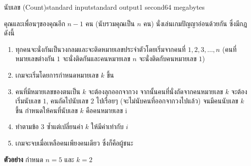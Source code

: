 \documentclass[11pt,a4paper]{article}
\begin{document}
\begin{problem}{นับเลข (Count)}{standard input}{standard output}{1 second}{64 megabytes}

คุณและเพื่อนๆของคุณอีก $n-1$ คน (นับรวมคุณเป็น $n$ คน) นั่งเล่นเกมปัญญาอ่อนด้วยกัน ซึ่งมีกฎดังนี้
\begin{enumerate}

\item ทุกคนจะนั่งกันเป็นวงกลมและจะติดหมายเลขประจำตัวโดยเริ่มจากคนที่ $1, 2, 3, … , n$ (คนที่หมายเลขต่างกัน $1$ จะนั่งติดกันและคนหมายเลข $n$ จะนั่งติดกับคนหมายเลข $1$)

\item เกมจะเริ่มโดยการกำหนดหมายเลข $k$ ขึ้น

\item คนที่มีหมายเลขของตนเป็น $k$ จะต้องลุกออกจากวง จากนั้นคนที่นั่งถัดจากคนหมายเลข $k$ จะต้องเริ่มนับเลข $1$, คนถัดไปนับเลข $2$ ไปเรื่อยๆ (จะไม่นับคนที่ออกจากวงไปแล้ว) จนมีคนนับเลข $k$ ขึ้น กำหนดให้คนที่นับเลข $k$ คือคนหมายเลข i

\item ทำตามข้อ $3$ ซ้ำแต่เปลี่ยนค่า $k$ ให้มีค่าเท่ากับ $i$

\item เกมจะจบเมื่อเหลือคนเพียงคนเดียว ซึ่งก็คือผู้ชนะ
\end{enumerate}

\textbf{ตัวอย่าง} กำหนด $n = 5$ และ $k = 2$


\end{problem}
\end{document}
